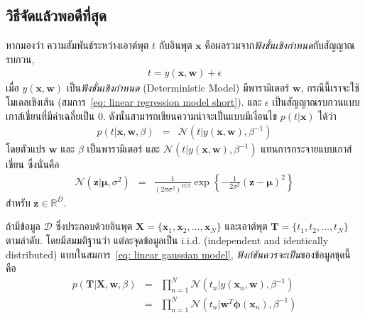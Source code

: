 

\subsection{วิธีจัดแล้วพอดีที่สุด}
\label{section: linear maximum likelihood}

หากมองว่า ความสัมพันธ์ระหว่างเอาต์พุต $t$ กับอินพุต $\mathbf{x}$ 
คือผลรวมจาก\textit{ฟังชั่นเชิงกำหนด}กับสัญญาณรบกวน,
\begin{eqnarray}
   t = y(\mathbf{x}, \mathbf{w}) + \epsilon
\label{eq: linear deterministic and stochastic parts}
\end{eqnarray} 
เมื่อ $y(\mathbf{x}, \mathbf{w})$ เป็น\textit{ฟังชั่นเชิงกำหนด} (Deterministic Model) มีพารามิเตอร์ $\mathbf{w}$, กรณีนี้เราจะใช้โมเดลเชิงเส้น (สมการ~\ref{eq: linear regression model short}).
และ $\epsilon$ เป็นสัญญาณรบกวนแบบเกาส์เชี่ยนที่มีค่าเฉลี่ยเป็น $0$.
ดังนั้นสามารถเขียนความน่าจะเป็นแบบมีเงื่อนไข $p(t|\mathbf{x})$ ได้ว่า
\begin{eqnarray}
   p(t|\mathbf{x}, \mathbf{w}, \beta) 
   &=& \mathcal{N}(t|y(\mathbf{x}, \mathbf{w}), \beta^{-1})
\label{eq: linear gaussian model}
\end{eqnarray}
โดยตัวแปร $\mathbf{w}$ และ $\beta$ เป็นพารามิเตอร์ 
และ $\mathcal{N}(t|y(\mathbf{x}, \mathbf{w}), \beta^{-1})$ แทนการกระจายแบบเกาส์เชี่ยน
ซึ่งนั่นคือ
\begin{eqnarray}
  \mathcal{N}(\mathbf{z}|\mathbf{\mu}, \sigma^2)
  &=& \frac{1}{(2 \pi \sigma^2)^{D/2}}
  \exp \left\{ -\frac{1}{2 \sigma^2} (\mathbf{z} - \mathbf{\mu})^2 \right\}
\nonumber 
\end{eqnarray}
สำหรับ $\mathbf{z} \in \mathbb{R}^D$.

ถ้ามีข้อมูล $\mathcal{D}$ ซึ่งประกอบด้วยอินพุต $\mathbf{X} = \{ \mathbf{x}_1, \mathbf{x}_2, \ldots, \mathbf{x}_N \}$ และเอาต์พุต $\mathbf{T} = \{t_1, t_2, \ldots, t_N\}$ ตามลำดับ.
โดยมีสมมติฐานว่า แต่ละจุดข้อมูลเป็น i.i.d. (independent and identically distributed) แบบในสมการ~\ref{eq: linear gaussian model}, \textit{ฟังก์ชันควรจะเป็น}ของข้อมูลชุดนี้ คือ 
%
\begin{eqnarray}
   p(\mathbf{T} | \mathbf{X}, \mathbf{w}, \beta) 
   &=& \prod_{n=1}^N \mathcal{N}( t_n | y(\mathbf{x}_n , \mathbf{w}), \beta^{-1})
\label{eq: linear likelihood} \\
   &=& \prod_{n=1}^N \mathcal{N}( t_n | \mathbf{w}^T \bm{\phi} ( \mathbf{x}_n ), \beta^{-1})
\label{eq: linear likelihood linear model}
\end{eqnarray}


